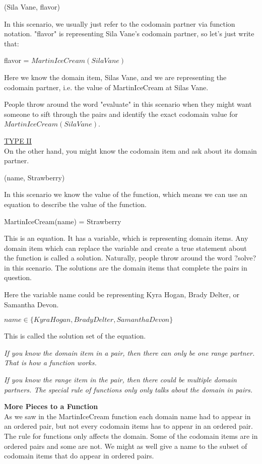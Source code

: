 \documentclass{ximera}
\begin{document}
\begin{center}
(Sila Vane, flavor)
\end{center}


In this scenario, we usually just refer to the codomain partner via function notation. "flavor" is representing Sila Vane's codomain partner, so let's just write that:
\begin{center}
flavor = $MartinIceCream(Sila Vane)$
\end{center}

Here we know the domain item, Silas Vane, and we are representing the codomain partner, i.e. the value of MartinIceCream at Silas Vane.  

People throw around the word "evaluate" in this scenario when they might want someone to sift through the pairs and identify the exact codomain value for $MartinIceCream(Sila Vane)$.

\underline{TYPE II} \\

On the other hand, you might know the codomain item and ask about its domain partner.
\begin{center}
(name, Strawberry)
\end{center}

In this scenario we know the value of the function, which means we can use an equation to describe the value of the function.
\begin{center}
MartinIceCream(name) = Strawberry 
\end{center}


This is an equation.  It has a variable, which is representing domain items. Any domain item which can replace the variable and create a true statement about the function is called a solution.  Naturally, people throw around the word ?solve? in this scenario. The solutions are the domain items that complete the pairs in question.

Here the variable name could be representing Kyra Hogan, Brady Delter, or Samantha Devon.


$name \in \{ Kyra Hogan, Brady Delter, Samantha Devon \}$

This is called the solution set of the equation.

\textit{If you know the domain item in a pair, then there can only be one range partner.  That is how a function works.}

\textit{If you know the range item in the pair, then there could be multiple domain partners. The special rule of functions only only talks about the domain in pairs.}


\textbf{More Pieces to a Function} \\

As we saw in the MartinIceCream function each domain name had to appear in an ordered pair, but not every codomain items has to appear in an ordered pair. The rule for functions only affects the domain. Some of the codomain items are in ordered pairs and some are not. We might as well give a name to the subset of codomain items that do appear in ordered pairs.
\end{document}
